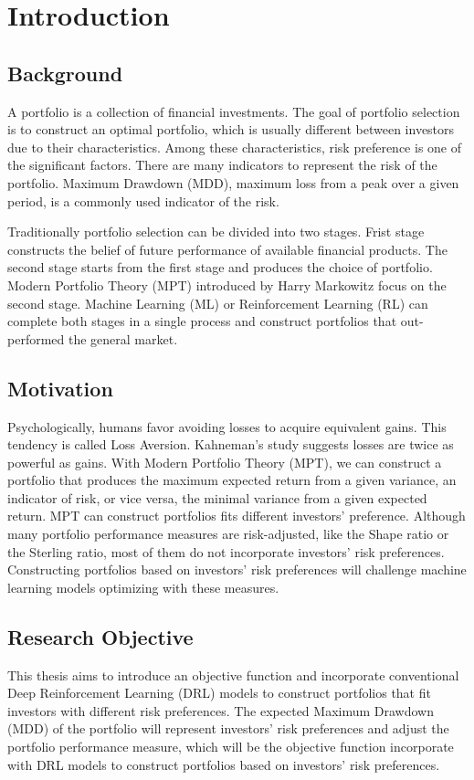 \chapter{Introduction}
\section {Background}
A portfolio is a collection of financial investments. The goal of portfolio selection is to construct an optimal portfolio, which is usually different between investors due to their characteristics. Among these characteristics, risk preference is one of the significant factors. There are many indicators to represent the risk of the portfolio. Maximum Drawdown (MDD),  maximum loss from a peak over a given period, is a commonly used indicator of the risk.

Traditionally portfolio selection can be divided into two stages. Frist stage constructs the belief of future performance of available financial products. The second stage starts from the first stage and produces the choice of portfolio.  Modern Portfolio Theory (MPT) introduced by  Harry Markowitz \cite{10.2307/2975974} focus on the second stage. Machine Learning (ML) or Reinforcement Learning (RL) can complete both stages in a single process and construct portfolios that out-performed the general market.\cite{KRAUSS2017689}
\section {Motivation}
Psychologically, humans favor avoiding losses to acquire equivalent gains. This tendency is called Loss Aversion.\cite{kahneman2000analysis} Kahneman's study suggests losses are twice as powerful as gains.\cite{Tversky1992} With Modern Portfolio Theory (MPT), we can construct a portfolio that produces the maximum expected return from a given variance, an indicator of risk, or vice versa, the minimal variance from a given expected return.\cite{10.2307/2975974} MPT can construct portfolios fits different investors' preference.
Although many portfolio performance measures are risk-adjusted\cite{cogneau2009101,cogneau2009more,cogneau2009more2}, like the Shape ratio\cite{Sharpe49} or the Sterling ratio\cite{magdon2004maximum}, most of them do not incorporate investors' risk preferences. Constructing portfolios based on investors' risk preferences will challenge machine learning models optimizing with these measures.

\section {Research Objective}
This thesis aims to introduce an objective function and incorporate conventional Deep Reinforcement Learning (DRL) models to construct portfolios that fit investors with different risk preferences. The expected Maximum Drawdown (MDD) of the portfolio will represent investors' risk preferences and adjust the portfolio performance measure, which will be the objective function incorporate with DRL models to construct portfolios based on investors' risk preferences.
\label{c:intro}

